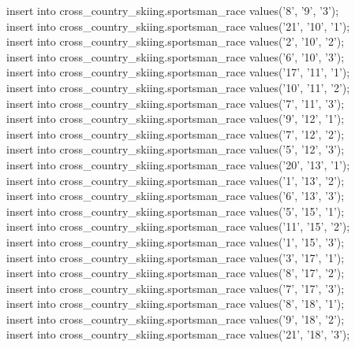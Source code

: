 \documentclass[a4paper,12pt]{article}
\begin{document}
insert into cross\_country\_skiing.sportsman\_race values('8',  '9', '3');\\
insert into cross\_country\_skiing.sportsman\_race values('21', '10',  '1');\\
insert into cross\_country\_skiing.sportsman\_race values('2',  '10',  '2');\\
insert into cross\_country\_skiing.sportsman\_race values('6',  '10',  '3');\\
insert into cross\_country\_skiing.sportsman\_race values('17', '11',  '1');\\
insert into cross\_country\_skiing.sportsman\_race values('10', '11',  '2');\\
insert into cross\_country\_skiing.sportsman\_race values('7',  '11',  '3');\\
insert into cross\_country\_skiing.sportsman\_race values('9',  '12',  '1');\\
insert into cross\_country\_skiing.sportsman\_race values('7',  '12',  '2');\\
insert into cross\_country\_skiing.sportsman\_race values('5',  '12',  '3');\\
insert into cross\_country\_skiing.sportsman\_race values('20', '13',  '1');\\
insert into cross\_country\_skiing.sportsman\_race values('1',  '13',  '2');\\
insert into cross\_country\_skiing.sportsman\_race values('6',  '13',  '3');\\
insert into cross\_country\_skiing.sportsman\_race values('5',  '15',  '1');\\
insert into cross\_country\_skiing.sportsman\_race values('11', '15',  '2');\\
insert into cross\_country\_skiing.sportsman\_race values('1',  '15',  '3');\\
insert into cross\_country\_skiing.sportsman\_race values('3',  '17',  '1');\\
insert into cross\_country\_skiing.sportsman\_race values('8',  '17',  '2');\\
insert into cross\_country\_skiing.sportsman\_race values('7',  '17',  '3');\\
insert into cross\_country\_skiing.sportsman\_race values('8',  '18',  '1');\\
insert into cross\_country\_skiing.sportsman\_race values('9',  '18',  '2');\\
insert into cross\_country\_skiing.sportsman\_race values('21', '18',  '3');\\
\end{document}
